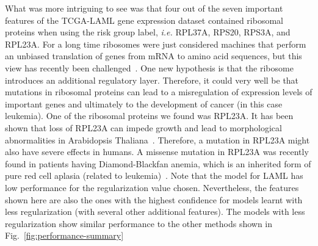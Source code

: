What was more intriguing to see was that four out of the seven important features of the TCGA-LAML gene expression dataset contained ribosomal proteins when using the risk group label, \emph{i.e.} RPL37A, RPS20, RPS3A, and RPL23A. For a long time ribosomes were just considered machines that perform an unbiased translation of genes from mRNA to amino acid sequences, but this view has recently been challenged~\cite{Xue2012}. One new hypothesis is that the ribosome introduces an additional regulatory layer. Therefore, it could very well be that mutations in ribosomal proteins can lead to a misregulation of expression levels of important genes and ultimately to the development of cancer (in this case leukemia). One of the ribosomal proteins we found was RPL23A. It has been shown that loss of RPL23A can impede growth and lead to morphological abnormalities in Arabidopsis Thaliana~\cite{Xue2012}. Therefore, a mutation in RPL23A might also have severe effects in humans. A missense mutation in RPL23A was recently found in patients having Diamond-Blackfan anemia, which is an inherited form of pure red cell aplasia (related to leukemia)~\cite{Gazda2012}. Note that the model for LAML has low performance for the regularization value chosen. Nevertheless, the features shown here are also the ones with the highest confidence for models learnt with less regularization (with several other additional features). The models with less regularization show similar performance to the other methods shown in Fig.~\ref{fig:performance-summary}

